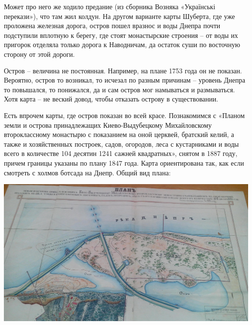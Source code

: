 Может про него же ходило предание (из сборника Возняка «Українські перекази»), что там жил колдун. На другом варианте карты Шуберта, где уже проложена железная дорога, остров пошел вразнос и воды Днепра почти подступили вплотную к берегу, где стоят монастырские строения – от воды их пригорок отделяла только дорога к Наводничам, да остаток суши по восточную сторону от этой дороги.

Остров – величина не постоянная. Например, на плане 1753 года он не показан. Вероятно, остров то возникал, то исчезал по разным причинам – уровень Днепра то повышался, то понижался, да и сам остров мог намываться и размываться. Хотя карта – не веский довод, чтобы отказать острову в существовании.

Есть впрочем карты, где остров показан во всей красе. Познакомимся с «Планом земли и острова принадлежащих Киево-Выдубецкому Михайловскому второклассному монастырю с показанием на оной церквей, братский келий, а также и хозяйственных построек, садов, огородов, леса с кустарниками и воды всего в количестве 104 десятин 1241 сажней квадратных», снятом в 1887 году, причем границы указаны по плану 1847 года. Карта ориентирована так, как если смотреть с холмов ботсада на Днепр. Общий вид плана:

\begin{center}
\includegraphics[width=\linewidth]{chast-vosp/zver/IMG_20170627_153827.jpg}
\end{center}

